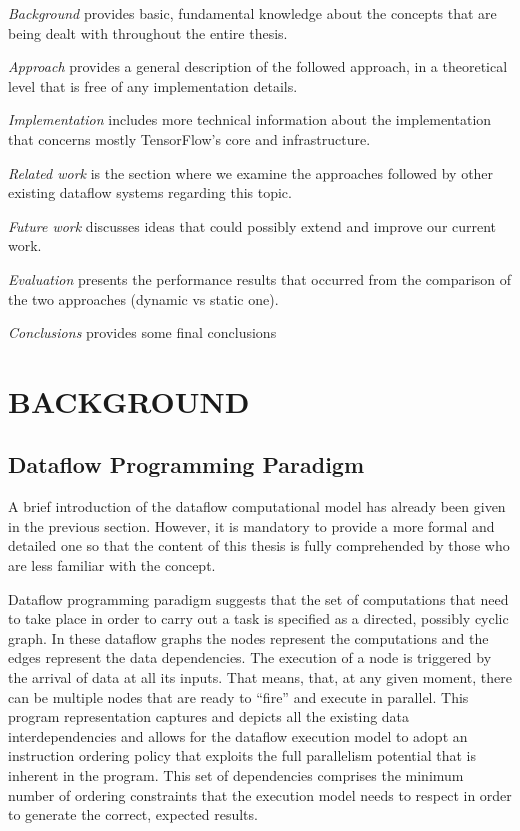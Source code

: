 \documentclass[ack,preface]{dithesis}
\begin{document}
\textit{Background} provides basic, fundamental knowledge about the concepts that are being dealt with throughout the entire thesis.

\textit{Approach} provides a general description of the followed approach, in a theoretical  level that is free of any implementation details.

\textit{Implementation} includes more technical information about the implementation that concerns mostly TensorFlow's core and infrastructure.

\textit{Related work} is the section where we examine the approaches followed by other existing dataflow systems regarding this topic.

\textit{Future work} discusses ideas that could possibly extend and improve our current work.

\textit{Evaluation} presents the performance results that occurred from the comparison of the two approaches (dynamic vs static one).

\textit{Conclusions} provides some final conclusions


\chapter{BACKGROUND}
    \section{Dataflow Programming Paradigm}
A brief introduction of the dataflow computational model has already been given in the previous section. However, it is mandatory to provide a more formal and detailed one so that the content of this thesis is fully comprehended by those who are less familiar with the concept.

Dataflow programming paradigm suggests that the set of computations that need to take place in order to carry out a task is specified as a directed, possibly cyclic graph. In these dataflow graphs the nodes represent the computations and the edges represent the data dependencies. The execution of a node is triggered by the arrival of data at all its inputs. That means, that, at any given moment, there can be multiple nodes that are ready to “fire” and execute in parallel. This program representation captures and depicts all the existing data interdependencies and allows for the dataflow execution model to adopt an instruction ordering policy that exploits the full parallelism potential that is inherent in the program. This set of dependencies comprises the minimum number of ordering constraints that the execution model needs to respect in order to generate the correct, expected results.
\end{document}
